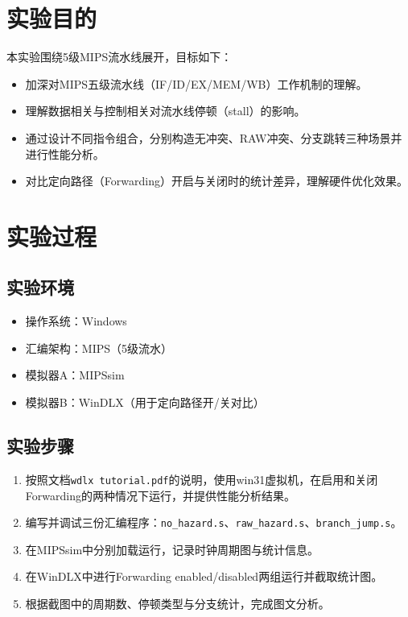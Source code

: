 \documentclass[12pt,a4paper]{ctexart}
\title{\reporttitle}
\author{\authname：\underline{李祥熙} \quad \authid：\underline{2234412799}}
\date{\today}
\begin{document}
\maketitle

\section{实验目的}
本实验围绕5级MIPS流水线展开，目标如下：
\begin{itemize}
	\item 加深对MIPS五级流水线（IF/ID/EX/MEM/WB）工作机制的理解。
	\item 理解数据相关与控制相关对流水线停顿（stall）的影响。
	\item 通过设计不同指令组合，分别构造无冲突、RAW冲突、分支跳转三种场景并进行性能分析。
	\item 对比定向路径（Forwarding）开启与关闭时的统计差异，理解硬件优化效果。
\end{itemize}

\section{实验过程}
\subsection{实验环境}
\begin{itemize}
	\item 操作系统：Windows
	\item 汇编架构：MIPS（5级流水）
	\item 模拟器A：MIPSsim
	\item 模拟器B：WinDLX（用于定向路径开/关对比）
\end{itemize}

\subsection{实验步骤}
\begin{enumerate}
    \item 按照文档\texttt{wdlx tutorial.pdf}的说明，使用win31虚拟机，在启用和关闭Forwarding的两种情况下运行，并提供性能分析结果。
	\item 编写并调试三份汇编程序：\texttt{no\_hazard.s}、\texttt{raw\_hazard.s}、\texttt{branch\_jump.s}。
	\item 在MIPSsim中分别加载运行，记录时钟周期图与统计信息。
	\item 在WinDLX中进行Forwarding enabled/disabled两组运行并截取统计图。
	\item 根据截图中的周期数、停顿类型与分支统计，完成图文分析。
\end{enumerate}
\end{document}
